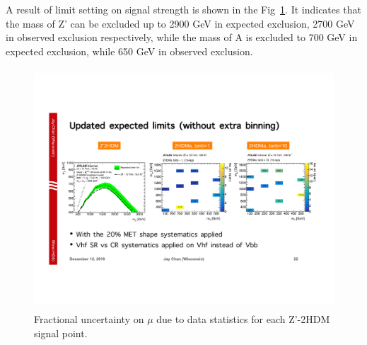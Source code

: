 \par A result of limit setting on signal strength is shown in the Fig~\ref{fig:zprime-2hdm-limit}. 
It indicates that the mass of Z' can be excluded up to 2900 GeV in expected exclusion, 2700 GeV in observed exclusion respectively, while the mass of A is excluded to 700 GeV in expected exclusion, while 650 GeV in observed exclusion.

\begin{figure}[!htb]
    \centering
    \includegraphics[width=12cm, height=9cm, trim={2.5cm 7.5cm 17.6cm 8cm}, clip]{chapters/c9/figures/ZPrime2HDMLimit.pdf}
    \caption{Fractional uncertainty on $\mu$ due to data statistics for each Z'-2HDM signal point.}
    \label{fig:zprime-2hdm-limit}
\end{figure}
